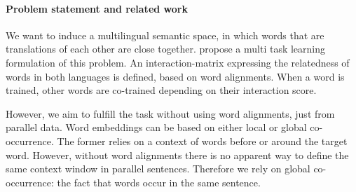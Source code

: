 \documentclass[a4paper,11pt]{article}
\begin{document}









\paragraph{Problem statement and related work}



We want to induce a multilingual semantic space, in which words that are translations of each other are close together. 
\cite{klementiev2012inducing} propose a multi task learning formulation of this problem. An interaction-matrix expressing the relatedness of words in both languages is defined, based on word alignments. When a word is trained, other words are co-trained depending on their interaction score.

However, we aim to fulfill the task without using word alignments, just from parallel data. Word embeddings can be based on either local or global co-occurrence. The former relies on a context of words before or around the target word. However, without word alignments there is no apparent way to define the same context window in parallel sentences. Therefore we rely on global co-occurrence: the fact that words occur in the same sentence. 
\end{document}
